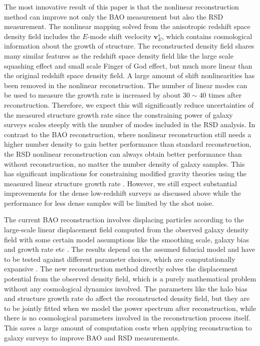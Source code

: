 \documentclass[aps,prx,twocolumn,superscriptaddress,groupedaddress,nofootinbib,amsfont]{revtex4}  %
\begin{document}
The most innovative result of this paper is that the nonlinear reconstruction
method can improve not only the BAO measurement but also the RSD measurement.
The nonlinear mapping solved from the anisotropic redshift space density field
includes the $E$-mode shift veclocity $\bm{v}^s_E$, which contains cosmological
information about the growth of structure. 
The reconstructed density field shares many similar features as the redshift 
space density field like the large scale squashing effect and small scale 
Finger of God effect, but much more linear than the original redshift space 
density field. A large amount of shift nonlinearities has been removed in the
nonlinear reconstruction. The number of linear modes can be used to measure the
growth rate is increased by about $30\sim40$ times after reconstruction. 
Therefore, we expect this will significantly reduce uncertainties of the 
measured structure growth rate since the constraining power of galaxy surveys
scales steeply with the number of modes included in the RSD analysis.
In contrast to the BAO reconstruction, where nonlinear reconstruction still 
needs a higher number density to gain better performance than standard 
reconstruction, the RSD nonlinear reconstruction can always obtain better 
performance than without reconstruction, no matter the number density of galaxy 
samples. This has significant implications for constraining modified gravity
theories using the measured linear structure growth rate \cite{2017Yu1}.
However, we still expect substantial improvements for the dense low-redshift 
surveys as discussed above while the performance for less dense samples
will be limited by the shot noise. 

The current BAO reconstruction involves displacing particles according to the 
large-scale linear displacement field computed from the observed galaxy density
field with some certain model assumptions like the smoothing scale, galaxy bias
and growth rate etc \cite{2007bao}. The results depend on the assumed fiducial
model and have to be tested against different parameter choices, which are 
computationally expansive \cite{2012nikhil}.
The new reconstruction method directly solves the displacement potential from 
the observed density field, which is a purely mathematical problem without any
cosmological dynamics involved.
The parameters like the halo bias and structure growth rate do affect the 
reconstructed density field, but they are to be jointly fitted when we model 
the power spectrum after reconstruction, while there is no cosmological 
parameters involved in the reconstruction process itself.
This saves a large amount of computation costs when applying reconstruction to 
galaxy surveys to improve BAO and RSD measurements.
\end{document}

